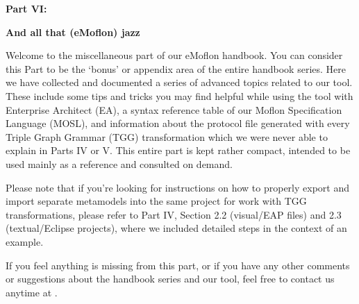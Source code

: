 \vspace*{2cm}

{\bf \huge Part VI:}
\vspace{1cm}

{\Huge \bf And all that (eMoflon) jazz}
\vspace{1cm}

\genHeader


\downloadLocation{\dlPartSix}

Welcome to the miscellaneous part of our eMoflon handbook. You can consider this
Part to be the `bonus' or appendix area of the entire handbook series. Here we have collected and documented a series of advanced topics related to our tool. These include some tips and tricks you may find helpful while using the tool with
Enterprise Architect (EA), a syntax reference table of our Moflon Specification Language (MOSL), and information about the protocol file generated with every
Triple Graph Grammar (TGG) transformation which we were never able to explain in Parts IV or V. This entire part is kept rather compact, intended to be used
mainly as a reference and consulted on demand.

Please note that if you're looking for instructions on how to properly export and import separate metamodels into the same project for work with TGG
transformations, please refer to Part IV, Section 2.2 (visual/EAP files) and 2.3 (textual/Eclipse projects), where we included detailed steps in the context of
an example.

If you feel anything is missing from this part, or if you have any other comments or suggestions about the handbook series and our tool, feel free to contact us
anytime at \eMoflonContact.





















